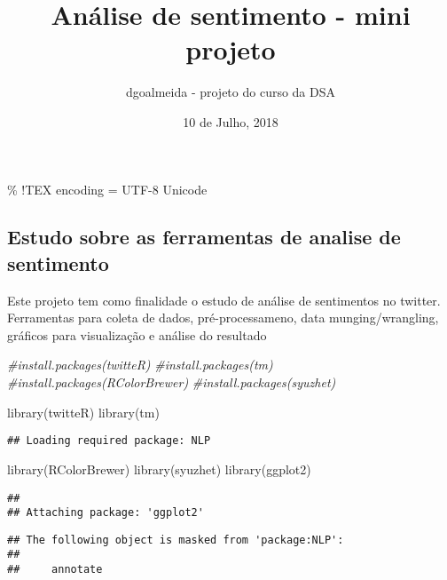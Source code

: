 \documentclass[
]{article}
\title{Análise de sentimento - mini projeto}
\author{dgoalmeida - projeto do curso da DSA}
\date{10 de Julho, 2018}
\newenvironment{Shaded}{\begin{snugshade}}{\end{snugshade}}
\newcommand{\CommentTok}[1]{\textcolor[rgb]{0.56,0.35,0.01}{\textit{#1}}}
\newcommand{\FunctionTok}[1]{\textcolor[rgb]{0.00,0.00,0.00}{#1}}
\newcommand{\NormalTok}[1]{#1}
\begin{document}
\maketitle

\% !TEX encoding = UTF-8 Unicode

\hypertarget{estudo-sobre-as-ferramentas-de-analise-de-sentimento}{%
\subsection{Estudo sobre as ferramentas de analise de
sentimento}\label{estudo-sobre-as-ferramentas-de-analise-de-sentimento}}

Este projeto tem como finalidade o estudo de análise de sentimentos no
twitter. Ferramentas para coleta de dados, pré-processameno, data
munging/wrangling, gráficos para visualização e análise do resultado

\begin{Shaded}
\begin{Highlighting}[]
\CommentTok{\#install.packages(\textquotesingle{}twitteR\textquotesingle{})}
\CommentTok{\#install.packages(\textquotesingle{}tm\textquotesingle{})}
\CommentTok{\#install.packages(\textquotesingle{}RColorBrewer\textquotesingle{})}
\CommentTok{\#install.packages(\textquotesingle{}syuzhet\textquotesingle{})}

\FunctionTok{library}\NormalTok{(twitteR)}
\FunctionTok{library}\NormalTok{(tm)}
\end{Highlighting}
\end{Shaded}

\begin{verbatim}
## Loading required package: NLP
\end{verbatim}

\begin{Shaded}
\begin{Highlighting}[]
\FunctionTok{library}\NormalTok{(RColorBrewer)}
\FunctionTok{library}\NormalTok{(syuzhet)}
\FunctionTok{library}\NormalTok{(ggplot2)}
\end{Highlighting}
\end{Shaded}

\begin{verbatim}
## 
## Attaching package: 'ggplot2'
\end{verbatim}

\begin{verbatim}
## The following object is masked from 'package:NLP':
## 
##     annotate
\end{verbatim}
\end{document}
